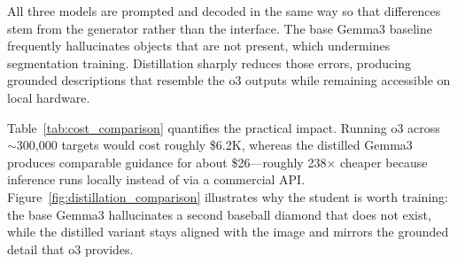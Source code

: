 All three models are prompted and decoded in the same way so that differences stem from the generator rather than the interface. The base Gemma3 baseline frequently hallucinates objects that are not present, which undermines segmentation training. Distillation sharply reduces those errors, producing grounded descriptions that resemble the o3 outputs while remaining accessible on local hardware.

Table~\ref{tab:cost_comparison} quantifies the practical impact. Running o3 across \(\sim\)300{,}000 targets would cost roughly \$6.2K, whereas the distilled Gemma3 produces comparable guidance for about \$26—roughly 238× cheaper because inference runs locally instead of via a commercial API. Figure~\ref{fig:distillation_comparison} illustrates why the student is worth training: the base Gemma3 hallucinates a second baseball diamond that does not exist, while the distilled variant stays aligned with the image and mirrors the grounded detail that o3 provides.

\begin{table}[t]
\centering
\caption{Cost Analysis: Gemma3 vs. o3 Model for Large-Scale Annotation\protect\footnotemark}
\label{tab:cost_comparison}
\end{table}

